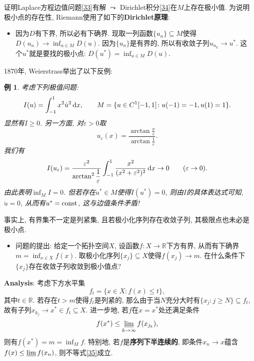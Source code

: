 \documentclass[12pt,a4paper]{article}
\newtheorem{example}[theorem]{例}
\begin{document}
证明Laplace方程边值问题\eqref{33}有解 $\leadsto$ Dirichlet积分\eqref{34}在$M$上存在极小值.
为说明极小点的存在性, Riemann使用了如下的\textbf{Dirichlet原理}:

\begin{itemize}
    \item 因为$D$有下界, 所以必有下确界. 现取一列函数$\{u_n\} \subseteq M$使得$D(u_n) \rightarrow \inf_{u \in M}D(u)$.
    因为$\{u_n\}$是有界的, 所以有收敛子列$u_{n_k} \rightarrow u^*$. 这个$u^*$就是要找的极小点: $D(u^*) = \inf_{u \in M}D(u)$.
\end{itemize}

1870年, Weierstrass举出了以下反例:

\begin{example}
    考虑下列极值问题:
    \begin{equation*}
        I(u) = \int_{-1}^1x^2\dot u^2 \,{\rm d}x, \qquad M = \{u \in C^1[-1, 1]\colon u(-1) = -1, u(1) = 1\}.
    \end{equation*}
    显然有$I \geq 0$. 另一方面, 对$\varepsilon > 0$取 
    \begin{equation*}
        u_{\varepsilon}(x) = \frac{\arctan \displaystyle\frac{x}{\varepsilon}}{\arctan \displaystyle\frac{1}{\varepsilon}}.
    \end{equation*}
    我们有 
    \begin{equation*}
        I(u_{\varepsilon}) = \frac{\varepsilon^2}{\arctan^2\displaystyle\frac{1}{\varepsilon}}\int_{-1}^1\frac{x^2}{(x^2 + \varepsilon^2)^2} \,{\rm d}x \rightarrow 0 \qquad (\varepsilon \rightarrow 0).
    \end{equation*}
    由此表明$\inf_MI = 0$. 但若存在$u^* \in M$使得$I(u^*) = 0$, 则由$I$的具体表达式可知, $\dot u = 0$, 从而有$u^* = {\rm const}$, 这与边值条件矛盾!
\end{example}

事实上, 有界集不一定是列紧集, 且若极小化序列存在收敛子列, 其极限点也未必是极小点.

\begin{itemize}
    \item 问题的提出: 给定一个拓扑空间$X$, 设函数$f\colon X \rightarrow \mathbb{R}$下方有界, 从而有下确界$m = \inf_{x \in X}f(x)$.
    取极小化序列$\{x_j\} \subseteq X$使得$f(x_j) \rightarrow m$. 在什么条件下$\{x_j\}$存在收敛子列收敛到极小值点?    
\end{itemize}

\textbf{Analysis}: 考虑下方水平集 
\begin{equation*}
    f_t = \{x \in X\colon f(x) \leq t\},
\end{equation*}
其中$t \in \mathbb{R}$. 若存在$t > m$使得$f_t$是列紧的, 那么由于当$N$充分大时有$\{x_j\colon j \geq N\} \subseteq f_t$, 故有子列$x_{k_j} \rightarrow x^* \in f_t \subseteq X$. 
进一步地, 若$f$在$x = x^*$处还满足条件 
\begin{equation}\label{35}
    f(x^*) \leq \varliminf\limits_{k \rightarrow \infty}f(x_{j_k}),
\end{equation}
则有$f(x^*) = m = \inf_Mf$. 特别地, 若$f$是\textbf{序列下半连续的}, 即条件$x_n \rightarrow x$蕴含$f(x) \leq \varliminf f(x_n)$, 则不等式\eqref{35}成立.
\end{document}
